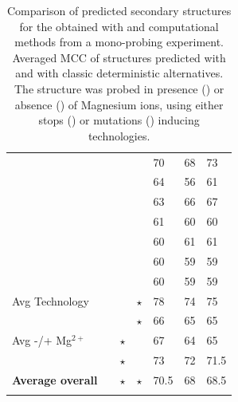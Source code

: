 \documentclass[a4,center,fleqn]{NAR}
\begin{document}
\begin{table}
{\begin{adjustbox}{max width=\linewidth}
\begin{tabular}{@{}lcccHHH}
			\CMCTMg                      &  &  \Stop  &    \Mg    & 70                                   & 68                  & 73                \\
			\OneMSevILUThree                     &  &  \Mut   &   \NoMg   & 64                                   & 56                  & 61                \\
			\DMSMg                       &  &  \Stop  &    \Mg    & 63                                   & 66                  & 67                \\
			\NMIACE                      &  &  \Stop  &   \NoMg   & 61                                   & 60                  & 60                \\
			\OneMSevCE                       &  &  \Stop  &   \NoMg   & 60                                   & 61                  & 61                \\
			\BzCN                        &  &  \Stop  &   \NoMg   & 60                                   & 59                  & 59                \\
			\NAICE                         &  &  \Stop  &   \NoMg   & 60                                   & 59                  & 59                \\ \midrule
			Avg Technology              &          &  \Mut   &  $\star$  & 78                                   & 74                  & 75                \\
			                            &          &  \Stop  &  $\star$  & 66                                   & 65                  & 65                \\
			Avg -/+ Mg$^{2+}$           &          & $\star$ &   \NoMg   & 67                                   & 64                  & 65                \\
			                            &          & $\star$ &    \Mg    & 73                                   & 72                  & 71.5               \\ \midrule
			{\bfseries Average overall} &          & $\star$ &  $\star$  & 70.5                                 & 68                  & 68.5               \\ \bottomrule
			                            &          &         &           &
		\end{tabular}
		\end{adjustbox}\\[1em]}
	
	\caption{Comparison of predicted secondary structures for the \didy{} obtained with \OurTool{} and computational methods from a mono-probing experiment. Averaged MCC of structures predicted with \OurTool{} and with classic deterministic alternatives. The structure was probed in presence (\Mg) or absence (\NoMg) of Magnesium ions, using either stops (\Stop) or mutations (\Mut) inducing technologies.
	}
	\label{tab:thermo-ipan}
\end{table}
\end{document}

